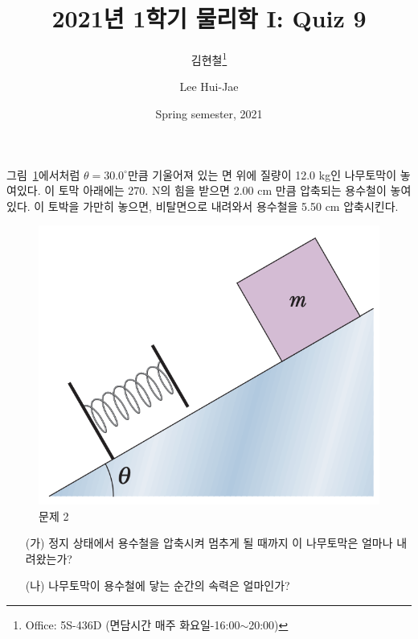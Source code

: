 \documentclass[floatfix,nofootinbib,superscriptaddress,fleqn]{revtex4-2}
\begin{document}
\title{\Large 2021년 1학기 물리학 I: Quiz 9}
\author{김현철\footnote{Office: 5S-436D (면담시간 매주
    화요일-16:00$\sim$20:00)}} 
\author{Lee Hui-Jae} 
\date{Spring semester, 2021}

\maketitle

그림~\ref{fig:2}에서처럼
$\theta=30.0^\circ$만큼 기울어져 있는 면 위에 질량이 12.0 kg인
나무토막이 놓여있다. 이 토막 아래에는 270. N의 힘을 받으면 2.00 cm
만큼 압축되는 용수철이 놓여있다. 이 토박을 가만히 놓으면, 비탈면으로
내려와서 용수철을 5.50 cm 압축시킨다.
\begin{figure}[ht]
  \centering
\includegraphics[scale=0.5]{Qfig9-2-20210330.png}  
  \caption{문제 2}
  \label{fig:2}
\end{figure}

\begin{itemize}
\item[(가)] 정지 상태에서 용수철을 압축시켜 멈추게 될 때까지 이
  나무토막은 얼마나 내려왔는가?
\item[(나)] 나무토막이 용수철에 닿는 순간의 속력은 얼마인가?   
\end{itemize}
\end{document}

